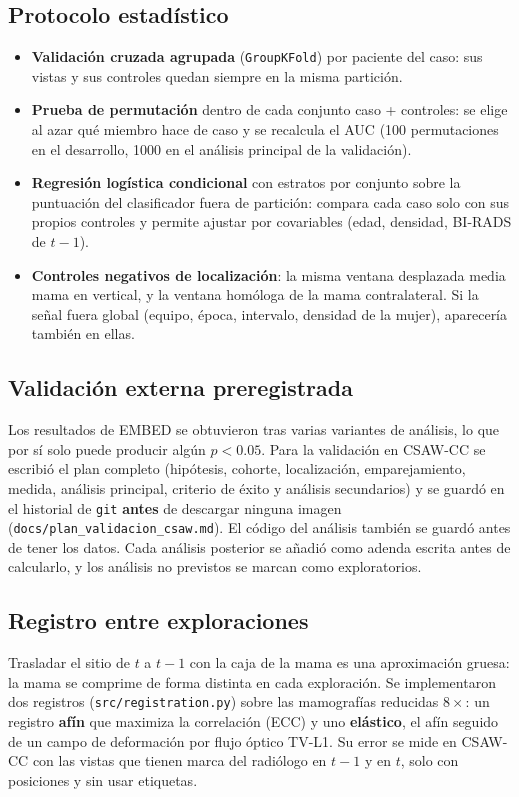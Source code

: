 \subsection{Protocolo estadístico}
\label{subsec:protocolo-longitudinal}
\begin{itemize}
  \item \textbf{Validación cruzada agrupada} (\texttt{GroupKFold}) por
        paciente del caso: sus vistas y sus controles quedan siempre en la
        misma partición.
  \item \textbf{Prueba de permutación} dentro de cada conjunto caso +
        controles: se elige al azar qué miembro hace de caso y se recalcula
        el AUC (100 permutaciones en el desarrollo, 1000 en el análisis
        principal de la validación).
  \item \textbf{Regresión logística condicional} con estratos por conjunto
        sobre la puntuación del clasificador fuera de partición: compara
        cada caso solo con sus propios controles y permite ajustar por
        covariables (edad, densidad, BI-RADS de $t-1$).
  \item \textbf{Controles negativos de localización}: la misma ventana
        desplazada media mama en vertical, y la ventana homóloga de la mama
        contralateral. Si la señal fuera global (equipo, época, intervalo,
        densidad de la mujer), aparecería también en ellas.
\end{itemize}

\subsection{Validación externa preregistrada}
\label{subsec:preregistro}
Los resultados de EMBED se obtuvieron tras varias variantes de análisis, lo
que por sí solo puede producir algún $p < 0.05$. Para la validación en
CSAW-CC se escribió el plan completo (hipótesis, cohorte, localización,
emparejamiento, medida, análisis principal, criterio de éxito y análisis
secundarios) y se guardó en el historial de \texttt{git} \textbf{antes} de
descargar ninguna imagen (\texttt{docs/plan\_validacion\_csaw.md}). El
código del análisis también se guardó antes de tener los datos. Cada
análisis posterior se añadió como adenda escrita antes de calcularlo, y los
análisis no previstos se marcan como exploratorios.

\subsection{Registro entre exploraciones}
Trasladar el sitio de $t$ a $t-1$ con la caja de la mama es una aproximación
gruesa: la mama se comprime de forma distinta en cada exploración. Se
implementaron dos registros (\texttt{src/registration.py}) sobre las
mamografías reducidas $8\times$: un registro \textbf{afín} que maximiza la
correlación (ECC) y uno \textbf{elástico}, el afín seguido de un campo de
deformación por flujo óptico TV-L1. Su error se mide en CSAW-CC con las
vistas que tienen marca del radiólogo en $t-1$ y en $t$, solo con
posiciones y sin usar etiquetas.

